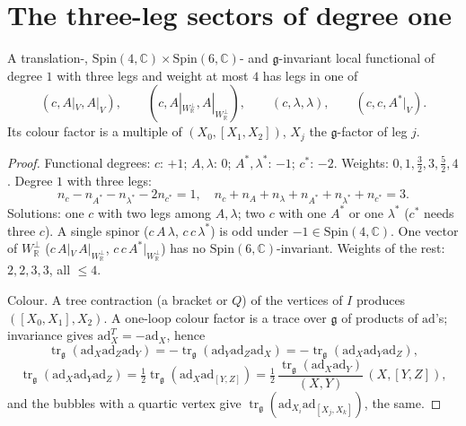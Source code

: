 \section{The three-leg sectors of degree one}

\begin{lemma}
\label{lem:s2c-legs}
A translation-, $\mathrm{Spin}(4,\mathbb C)\times\mathrm{Spin}(6,\mathbb C)$- and $\mathfrak g$-invariant local functional of degree $1$ with three legs and weight at most $4$ has legs in one of
\[
(c,A|_V,A|_V),\qquad (c,A|_{W_{\mathbb R}^\perp},A|_{W_{\mathbb R}^\perp}),\qquad (c,\lambda,\lambda),\qquad (c,c,A^*|_V).
\]
Its colour factor is a multiple of $(X_0,[X_1,X_2])$, $X_j$ the $\mathfrak g$-factor of leg $j$.
\end{lemma}

\begin{proof}
Functional degrees: $c$: $+1$; $A,\lambda$: $0$; $A^*,\lambda^*$: $-1$; $c^*$: $-2$. Weights: $0,1,\tfrac32,3,\tfrac52,4$. Degree $1$ with three legs:
\[
n_c-n_{A^*}-n_{\lambda^*}-2n_{c^*}=1,\quad n_c+n_A+n_\lambda+n_{A^*}+n_{\lambda^*}+n_{c^*}=3 .
\]
Solutions: one $c$ with two legs among $A,\lambda$; two $c$ with one $A^*$ or one $\lambda^*$ ($c^*$ needs three $c$). A single spinor ($c\,A\,\lambda$, $c\,c\,\lambda^*$) is odd under $-1\in\mathrm{Spin}(4,\mathbb C)$. One vector of $W_{\mathbb R}^\perp$ ($c\,A|_V\,A|_{W_{\mathbb R}^\perp}$, $c\,c\,A^*|_{W_{\mathbb R}^\perp}$) has no $\mathrm{Spin}(6,\mathbb C)$-invariant. Weights of the rest: $2,2,3,3$, all $\le4$.

Colour. A tree contraction (a bracket or $Q$) of the vertices of $I$ produces $([X_0,X_1],X_2)$. A one-loop colour factor is a trace over $\mathfrak g$ of products of $\mathrm{ad}$'s; invariance gives $\mathrm{ad}_X^{T}=-\mathrm{ad}_X$, hence
\[
\operatorname{tr}_{\mathfrak g}(\mathrm{ad}_X\mathrm{ad}_Z\mathrm{ad}_Y)=-\operatorname{tr}_{\mathfrak g}(\mathrm{ad}_Y\mathrm{ad}_Z\mathrm{ad}_X)=-\operatorname{tr}_{\mathfrak g}(\mathrm{ad}_X\mathrm{ad}_Y\mathrm{ad}_Z),
\]
\[
\operatorname{tr}_{\mathfrak g}(\mathrm{ad}_X\mathrm{ad}_Y\mathrm{ad}_Z)=\tfrac12\operatorname{tr}_{\mathfrak g}(\mathrm{ad}_X\mathrm{ad}_{[Y,Z]})=\tfrac12\,\frac{\operatorname{tr}_{\mathfrak g}(\mathrm{ad}_X\mathrm{ad}_Y)}{(X,Y)}\,(X,[Y,Z]),
\]
and the bubbles with a quartic vertex give $\operatorname{tr}_{\mathfrak g}(\mathrm{ad}_{X_i}\mathrm{ad}_{[X_j,X_k]})$, the same.
\end{proof}

